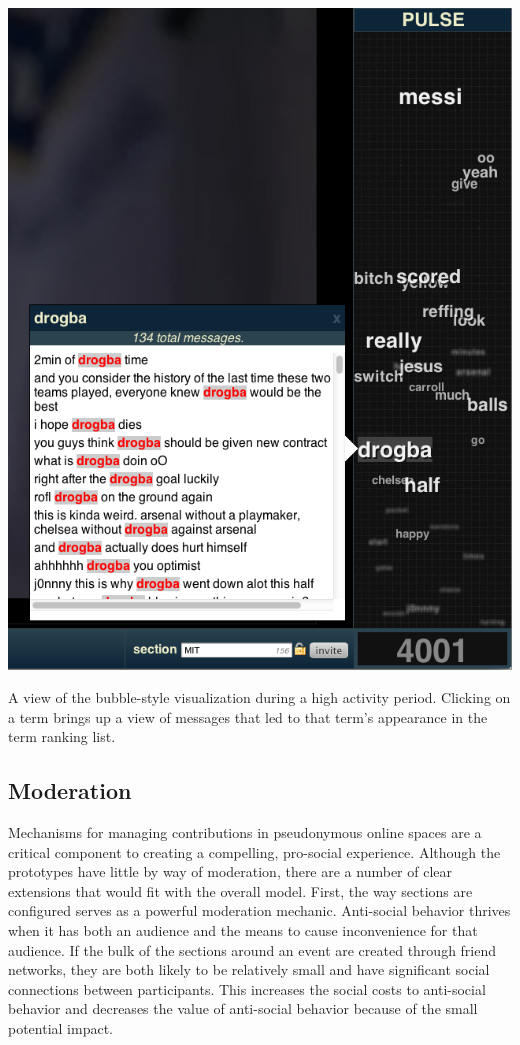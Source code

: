 \begin{marginfigure}
	\includegraphics{figures/roar/bubble_detail.png}
	\caption{A view of the bubble-style visualization during a high activity period. Clicking on a term brings up a view of messages that led to that term's appearance in the term ranking list.}
	\label{fig:pulse_bubble_detail}
\end{marginfigure}


\subsection{Moderation}

Mechanisms for managing contributions in pseudonymous online spaces are a critical component to creating a compelling, pro-social experience. Although the prototypes have little by way of moderation, there are a number of clear extensions that would fit with the overall model. First, the way sections are configured serves as a powerful moderation mechanic. Anti-social behavior thrives when it has both an audience and the means to cause inconvenience for that audience. If the bulk of the sections around an event are  created through friend networks, they are both likely to be relatively small and have significant social connections between participants. This increases the social costs to anti-social behavior and decreases the value of anti-social behavior because of the small potential impact. 

